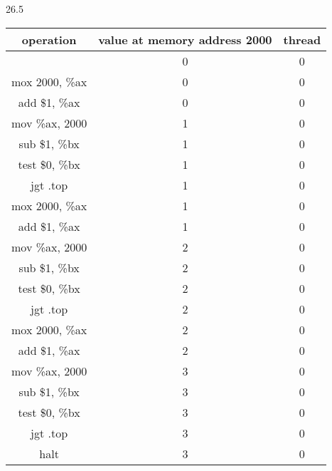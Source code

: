 \documentclass[12pt, a4paper]{article}
\begin{document}
26.5

	\begin{center}
	\begin{tabular}{||c c c||} 
	 \hline
	  operation &  value at memory address 2000 & thread \\ [0.5ex] 
	 \hline\hline
	 & 0 & 0 \\
	 \hline
	 mox 2000, \%ax  & 0 &0 \\ 
	 \hline
	 add \$1, \%ax & 0 & 0 \\
	 \hline
	 mov \%ax, 2000 & 1 & 0 \\
	 \hline
	 sub \$1, \%bx & 1 & 0 \\
	 \hline
	 test \$0, \%bx & 1 & 0 \\
	\hline
	jgt .top & 1 & 0 \\
	\hline
	
	mox 2000, \%ax  & 1 &0 \\ 
	 \hline
	 add \$1, \%ax & 1 & 0 \\
	 \hline
	 mov \%ax, 2000 & 2 & 0 \\
	 \hline
	 sub \$1, \%bx & 2 & 0 \\
	 \hline
	 test \$0, \%bx & 2 & 0 \\
	\hline
	jgt .top & 2 & 0 \\
	\hline
	
	mox 2000, \%ax  & 2 &0 \\ 
	 \hline
	 add \$1, \%ax & 2 & 0 \\
	 \hline
	 mov \%ax, 2000 & 3 & 0 \\
	 \hline
	 sub \$1, \%bx & 3 & 0 \\
	 \hline
	 test \$0, \%bx & 3 & 0 \\
	\hline
	jgt .top & 3 & 0 \\
	\hline
	
	halt & 3 & 0 \\ 
	\hline
	\end{tabular}
	\end{center}
	
\end{document}
